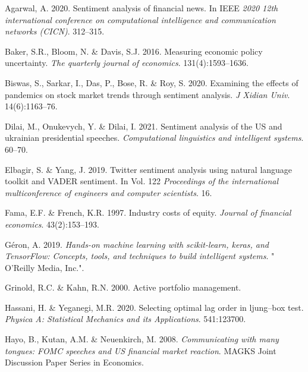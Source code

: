 \documentclass[11pt,preprint, authoryear]{elsarticle}
\numberwithin{equation}{section}
\numberwithin{figure}{section}
\numberwithin{table}{section}
\newlength{\cslhangindent}
\newenvironment{CSLReferences}%
  {\setlength{\parindent}{0pt}%
  \everypar{\setlength{\hangindent}{\cslhangindent}}\ignorespaces}%
  {\par}
\begin{document}
\hypertarget{refs}{}
\begin{CSLReferences}{1}{0}
\leavevmode{}%
Agarwal, A. 2020. Sentiment analysis of financial news. In IEEE
\emph{2020 12th international conference on computational intelligence
and communication networks (CICN)}. 312--315.

\leavevmode{}%
Baker, S.R., Bloom, N. \& Davis, S.J. 2016. Measuring economic policy
uncertainty. \emph{The quarterly journal of economics}.
131(4):1593--1636.

\leavevmode{}%
Biswas, S., Sarkar, I., Das, P., Bose, R. \& Roy, S. 2020. Examining the
effects of pandemics on stock market trends through sentiment analysis.
\emph{J Xidian Univ}. 14(6):1163--76.

\leavevmode{}%
Dilai, M., Onukevych, Y. \& Dilai, I. 2021. Sentiment analysis of the US
and ukrainian presidential speeches. \emph{Computational linguistics and
intelligent systems}. 60--70.

\leavevmode{}%
Elbagir, S. \& Yang, J. 2019. Twitter sentiment analysis using natural
language toolkit and VADER sentiment. In Vol. 122 \emph{Proceedings of
the international multiconference of engineers and computer scientists}.
16.

\leavevmode{}%
Fama, E.F. \& French, K.R. 1997. Industry costs of equity. \emph{Journal
of financial economics}. 43(2):153--193.

\leavevmode{}%
Géron, A. 2019. \emph{Hands-on machine learning with scikit-learn,
keras, and TensorFlow: Concepts, tools, and techniques to build
intelligent systems}. " O'Reilly Media, Inc.".

\leavevmode{}%
Grinold, R.C. \& Kahn, R.N. 2000. Active portfolio management.

\leavevmode{}%
Hassani, H. \& Yeganegi, M.R. 2020. Selecting optimal lag order in
ljung--box test. \emph{Physica A: Statistical Mechanics and its
Applications}. 541:123700.

\leavevmode{}%
Hayo, B., Kutan, A.M. \& Neuenkirch, M. 2008. \emph{Communicating with
many tongues: FOMC speeches and US financial market reaction}. MAGKS
Joint Discussion Paper Series in Economics.


\end{CSLReferences}
\end{document}

